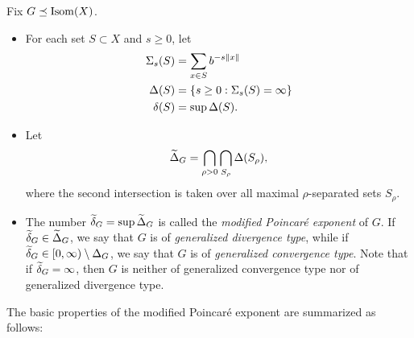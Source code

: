 \begin{definition}
\label{definitionmodifiedexponent}
Fix $G\preceq\operatorname{Isom}(X)$.
\begin{itemize}
\item For each set $S\subset X$ and $s\geq 0$, let
\begin{align*}
\Sigma_s(S) &= \sum_{x\in S} b^{-s\|x\|}\\
\Delta(S) &= \{s\geq 0: \Sigma_s(S) = \infty\}\\
\delta(S) &= \sup\Delta(S).
\end{align*}
\item Let
\begin{equation}
\label{modifiedpoincaredef}
\widetilde\Delta_G = \bigcap_{\rho > 0} \bigcap_{S_\rho} \Delta(S_\rho),
\end{equation}
where the second intersection is taken over all maximal $\rho$-separated sets $S_\rho$.
\item The number $\widetilde\delta_G = \sup\widetilde\Delta_G$ is called the \emph{modified Poincar\'e exponent} of $G$. If $\widetilde\delta_G\in\widetilde\Delta_G$, we say that $G$ is of \emph{generalized divergence type}, while if $\widetilde\delta_G\in{[0,\infty)}\setminus\Delta_G$, we say that $G$ is of \emph{generalized convergence type}. Note that if $\widetilde\delta_G = \infty$, then $G$ is neither of generalized convergence type nor of generalized divergence type.
\end{itemize}
\end{definition}

The basic properties of the modified Poincar\'e exponent are summarized as follows:

